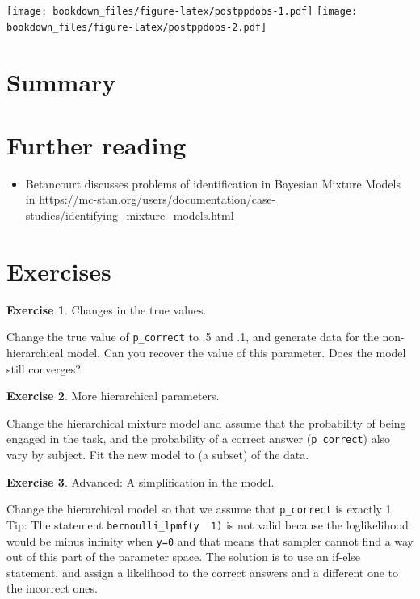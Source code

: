 \documentclass[12pt,]{krantz}
\providecommand{\tightlist}{%
  \setlength{\itemsep}{0pt}\setlength{\parskip}{0pt}}
\theoremstyle{definition}
\theoremstyle{definition}
\theoremstyle{definition}
\newtheorem{exercise}{Exercise}[chapter]
\theoremstyle{remark}
\begin{document}
\texttt{[image: bookdown\_files/figure-latex/postppdobs-1.pdf]} \texttt{[image: bookdown\_files/figure-latex/postppdobs-2.pdf]}

\hypertarget{summary-8}{%
\section{Summary}\label{summary-8}}

\hypertarget{further-reading-12}{%
\section{Further reading}\label{further-reading-12}}

\begin{itemize}
\tightlist
\item
  Betancourt discusses problems of identification in Bayesian Mixture Models in \url{https://mc-stan.org/users/documentation/case-studies/identifying_mixture_models.html}
\end{itemize}

\hypertarget{exercises-10}{%
\section{Exercises}\label{exercises-10}}

\begin{exercise}
\protect\hypertarget{exr:pcorrect}{}{\label{exr:pcorrect} }Changes in the true values.
\end{exercise}

Change the true value of \texttt{p\_correct} to .5 and .1, and generate data for the non-hierarchical model. Can you recover the value of this parameter. Does the model still converges?

\begin{exercise}
\protect\hypertarget{exr:mixhier}{}{\label{exr:mixhier} }More hierarchical parameters.
\end{exercise}

Change the hierarchical mixture model and assume that the probability of being engaged in the task, and the probability of a correct answer (\texttt{p\_correct}) also vary by subject. Fit the new model to (a subset) of the data.

\begin{exercise}
\protect\hypertarget{exr:simp}{}{\label{exr:simp} }Advanced: A simplification in the model.
\end{exercise}

Change the hierarchical model so that we assume that \texttt{p\_correct} is exactly 1. Tip: The statement \texttt{bernoulli\_lpmf(y\ \textbar{}\ 1)} is not valid because the loglikelihood would be minus infinity when \texttt{y=0} and that means that sampler cannot find a way out of this part of the parameter space. The solution is to use an if-else statement, and assign a likelihood to the correct answers and a different one to the incorrect ones.
\end{document}
